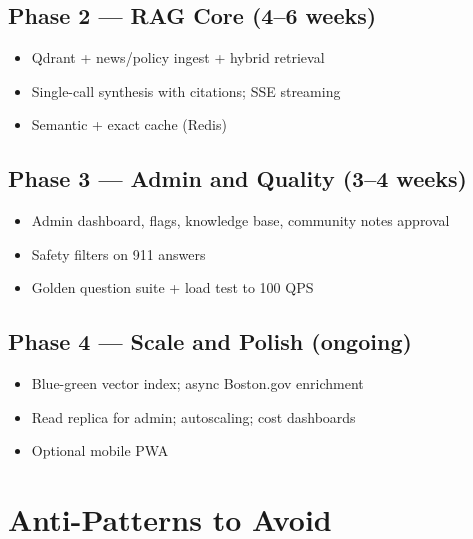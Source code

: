 \documentclass[11pt,a4paper]{article}
\begin{document}
\subsection{Phase 2 --- RAG Core (4--6 weeks)}
\begin{itemize}[noitemsep]
  \item Qdrant + news/policy ingest + hybrid retrieval
  \item Single-call synthesis with citations; SSE streaming
  \item Semantic + exact cache (Redis)
\end{itemize}

\subsection{Phase 3 --- Admin and Quality (3--4 weeks)}
\begin{itemize}[noitemsep]
  \item Admin dashboard, flags, knowledge base, community notes approval
  \item Safety filters on 911 answers
  \item Golden question suite + load test to 100 QPS
\end{itemize}

\subsection{Phase 4 --- Scale and Polish (ongoing)}
\begin{itemize}[noitemsep]
  \item Blue-green vector index; async Boston.gov enrichment
  \item Read replica for admin; autoscaling; cost dashboards
  \item Optional mobile PWA
\end{itemize}

\section{Anti-Patterns to Avoid}
\end{document}
